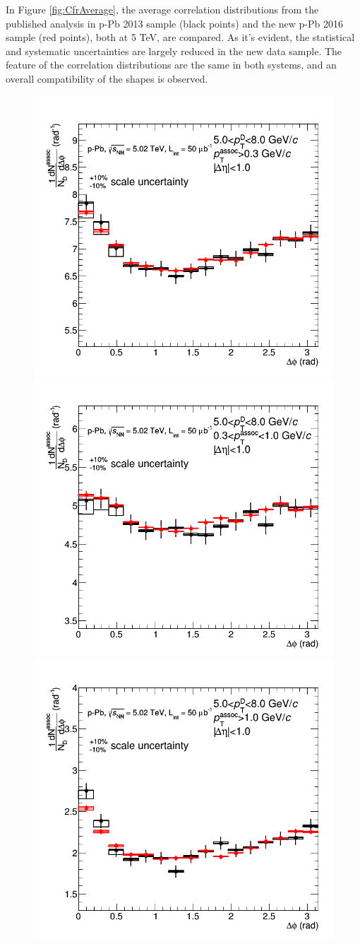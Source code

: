 In Figure \ref{fig:CfrAverage}, the average correlation distributions from the published analysis in p-Pb 2013 sample (black points) and the new p-Pb 2016 sample (red points), both at 5 TeV, are compared. As it's evident, the statistical and systematic uncertainties are largely reduced in the new data sample. The feature of the correlation distributions are the same in both systems, and an overall compatibility of the shapes is observed. 

\begin{figure}[!htbp]
\centering
\centering
{\includegraphics[width=0.47\linewidth]{figures/Cfr2013vs2016/Average_Cfr_2013_2016_Pt5to8_Thr03to99.png}}
{\includegraphics[width=0.47\linewidth]{figures/Cfr2013vs2016/Average_Cfr_2013_2016_Pt5to8_Thr03to1.png}}
{\includegraphics[width=0.47\linewidth]{figures/Cfr2013vs2016/Average_Cfr_2013_2016_Pt5to8_Thr1to99.png}}

\end{figure}
